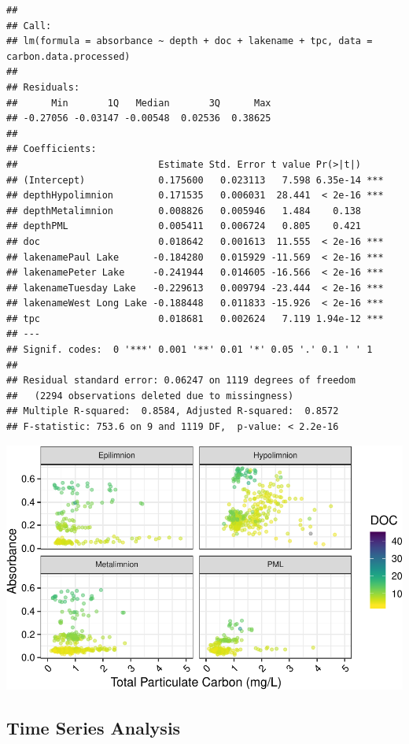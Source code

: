 \documentclass[12pt,]{article}
\begin{document}
\begin{verbatim}
## 
## Call:
## lm(formula = absorbance ~ depth + doc + lakename + tpc, data = carbon.data.processed)
## 
## Residuals:
##      Min       1Q   Median       3Q      Max 
## -0.27056 -0.03147 -0.00548  0.02536  0.38625 
## 
## Coefficients:
##                         Estimate Std. Error t value Pr(>|t|)    
## (Intercept)             0.175600   0.023113   7.598 6.35e-14 ***
## depthHypolimnion        0.171535   0.006031  28.441  < 2e-16 ***
## depthMetalimnion        0.008826   0.005946   1.484    0.138    
## depthPML                0.005411   0.006724   0.805    0.421    
## doc                     0.018642   0.001613  11.555  < 2e-16 ***
## lakenamePaul Lake      -0.184280   0.015929 -11.569  < 2e-16 ***
## lakenamePeter Lake     -0.241944   0.014605 -16.566  < 2e-16 ***
## lakenameTuesday Lake   -0.229613   0.009794 -23.444  < 2e-16 ***
## lakenameWest Long Lake -0.188448   0.011833 -15.926  < 2e-16 ***
## tpc                     0.018681   0.002624   7.119 1.94e-12 ***
## ---
## Signif. codes:  0 '***' 0.001 '**' 0.01 '*' 0.05 '.' 0.1 ' ' 1
## 
## Residual standard error: 0.06247 on 1119 degrees of freedom
##   (2294 observations deleted due to missingness)
## Multiple R-squared:  0.8584, Adjusted R-squared:  0.8572 
## F-statistic: 753.6 on 9 and 1119 DF,  p-value: < 2.2e-16
\end{verbatim}

\includegraphics{Bash_ENV872_Project_files/figure-latex/lin-1.pdf}
\newpage

\subsection{Time Series Analysis}\label{time-series-analysis}
\end{document}
